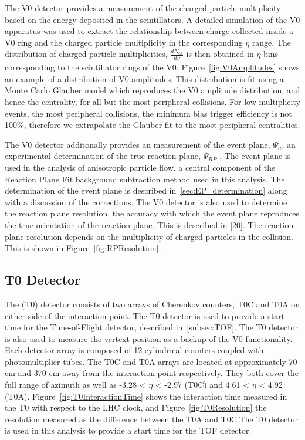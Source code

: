 The V0 detector provides a measurement of the charged particle multiplicity based on the energy deposited in the scintillators. A detailed simulation of the V0 apparatus was used to extract the relationship between charge collected inside a V0 ring and the charged particle multiplicity in the corresponding $\eta$ range. The distribution of charged particle multiplicities, $\frac{dN_{ch}}{d\eta}$ is then obtained in $\eta$ bins corresponding to the scintillator rings of the V0. Figure~\ref{fig:V0Amplitudes} shows an example of a distribution of V0 amplitudes. This distribution is fit using a Monte Carlo Glauber model which reproduces the V0 amplitude distribution, and hence the centrality, for all but the most peripheral collisions. For low multiplicity events, the most peripheral collisions, the minimum bias trigger efficiency is not 100\%, therefore we extrapolate the Glauber fit to the most peripheral centralities.

The V0 detector additonally provides an measurement of the event plane, $\Psi_n$, an experimental determination of the true reaction plane, $\Psi_{RP}$ . The event plane is used in the analysis of anisotropic particle flow, a central component of the Reaction Plane Fit background subtraction method used in this analysis. The determination of the event plane is described in~\ref{sec:EP_determination} along with a discussion of the corrections. The V0 detector is also used to determine the reaction plane resolution, the accuracy with which the event plane reproduces the true orientation of the reaction plane. This is described in [20]. The reaction plane resolution depends on the multiplicity of charged particles in the collision. This is shown in Figure~\ref{fig:RPResolution}.

\subsection{T0 Detector}

The (T0) detector consists of two arrays of Cherenkov counters, T0C and T0A on either side of the interaction point. The T0 detector is used to provide a start time for the Time-of-Flight detector, described in~\ref{subsec:TOF}. The T0 detector is also used to measure the vertext position as a backup of the V0 functionality. Each detector array is composed of 12 cylindrical counters coupled with photomultiplier tubes. The T0C and T0A arrays are located at approximately 70 cm and 370 cm away from the interaction point respectively. They both cover the full range of azimuth as well as -3.28 < $\eta$ < -2.97 (T0C) and 4.61 < $\eta$ < 4.92 (T0A). Figure~\ref{fig:T0InteractionTime} shows the interaction time measured in the T0 with respect to the LHC clock, and Figure~\ref{fig:T0Resolution} the resolution measured as the difference between the T0A and T0C.The T0 detector is used in this analysis to provide a start time for the TOF detector.

